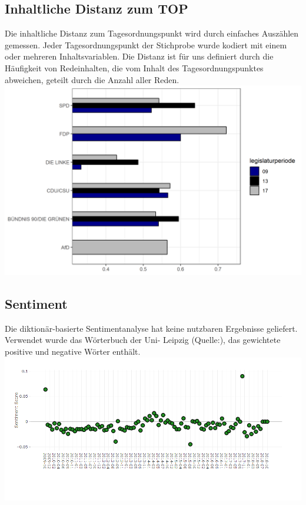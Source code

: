 \subsection{Inhaltliche Distanz zum TOP}

Die inhaltliche Distanz zum Tagesordnungspunkt wird durch einfaches Auszählen gemessen. Jeder Tagesordnungspunkt der Stichprobe wurde kodiert mit einem oder mehreren Inhaltsvariablen. Die Distanz ist für uns definiert durch die Häufigkeit von Redeinhalten, die vom Inhalt des Tagesordnungspunktes abweichen, geteilt durch die Anzahl aller Reden. \\
 
\includegraphics[width=\linewidth]{Grafiken/distop.png}\\


\subsection{Sentiment}

Die diktionär-basierte Sentimentanalyse hat keine nutzbaren Ergebnisse geliefert. Verwendet wurde das Wörterbuch der Uni- Leipzig (Quelle:), das gewichtete positive und negative Wörter enthält. \\

\includegraphics[width=\linewidth]{Grafiken/Sentimentscore.png}\\
\\

